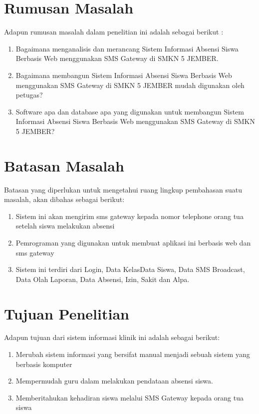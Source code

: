\documentclass{jtetiproposalskripsi}
\begin{document}
\section{Rumusan Masalah}
Adapun rumusan masalah dalam penelitian ini adalah sebagai berikut :
\begin{enumerate}
\item Bagaimana menganalisis dan merancang Sistem Informasi Absensi Siswa Berbasis Web menggunakan SMS Gateway di SMKN 5 JEMBER.
\item Bagaimana membangun Sistem Informasi Absensi Siswa Berbasis Web menggunakan SMS Gateway di SMKN 5 JEMBER mudah digunakan oleh petugas?
\item Software apa dan database apa yang digunakan untuk  membangun Sistem Informasi Absensi Siswa Berbasis Web menggunakan SMS Gateway di SMKN 5 JEMBER?
\end{enumerate}

\section{Batasan Masalah}
Batasan yang diperlukan untuk mengetahui ruang lingkup pembahasan suatu masalah, akan dibahas sebagai berikut:
\begin{enumerate}
\item Sistem ini akan mengirim sms gateway kepada nomor telephone orang tua setelah siswa melakukan absensi
\item Pemrograman yang digunakan untuk membuat aplikasi ini berbasis web dan sms gateway
\item Sistem ini terdiri dari Login, Data KelasData Siswa, Data SMS Broadcast, Data Olah Laporan, Data Absensi, Izin, Sakit dan Alpa.
\end{enumerate}

\section{Tujuan Penelitian}
Adapun tujuan dari sistem informasi klinik ini adalah sebagai berikut:
\begin{enumerate}
\item Merubah sistem informasi yang bersifat manual menjadi sebuah sistem yang berbasis komputer
\item Mempermudah guru dalam melakukan pendataan absensi siswa.
\item Memberitahukan kehadiran siswa melalui SMS Gateway kepada orang tua siswa
\end{enumerate}
\end{document}
